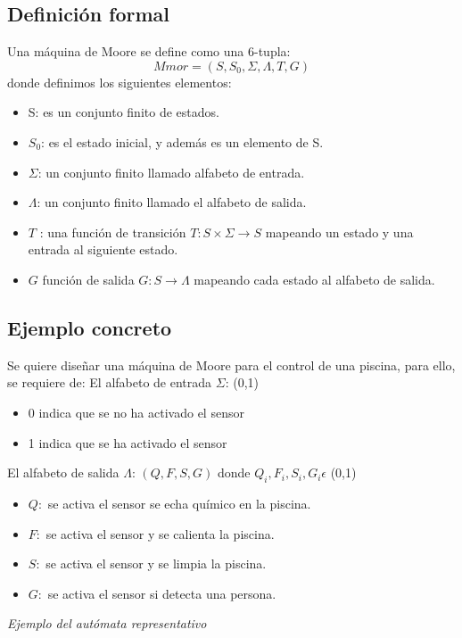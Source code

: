 \documentclass[12pt,a4paper]{article}
\begin{document}
	\subsection{Definición formal}
	Una máquina de Moore se define como una 6-tupla:
	\[ Mmor = (S,S_{0},\Sigma,\Lambda,T,G)  \]
	donde definimos los siguientes elementos:
	\begin{itemize}
		\item S: es un conjunto finito de estados.
		\item $S_{0}$: es el estado inicial, y además es un elemento de S.
		\item $\Sigma$: un conjunto finito llamado alfabeto de entrada.
		\item $\Lambda$: un conjunto finito llamado el alfabeto de salida.
		\item $T$ : una función de transición $T: S \times \Sigma \rightarrow S$ mapeando un estado y una entrada al siguiente estado.
		\item $G$ función de salida $G : S \rightarrow \Lambda $ mapeando cada estado al alfabeto de salida.
	\end{itemize}
	\clearpage
	\subsection{Ejemplo concreto}
	Se quiere diseñar una máquina de Moore para el control de una piscina, para ello, se requiere de:
	\newline
	\newline
	El alfabeto de entrada $\Sigma$: {(0,1)}	
	\begin{itemize}
		\item 0 indica que se no ha activado el sensor
		\item 1 indica que se ha activado el sensor
	\end{itemize}

El alfabeto de salida $\Lambda$: {$(Q,F,S,G)$ donde $Q_{i}, F_{i},S_{i},G_{i}\epsilon$ (0,1) }
	\begin{itemize}
		\item $Q:$ se activa el sensor se echa químico en la piscina.
		\item $F:$ se activa el sensor y se calienta la piscina.
		\item $S:$ se activa el sensor y se limpia la piscina.
		\item $G:$ se activa el sensor si detecta una persona.
	\end{itemize}
	
	
	\begin{center}
			
			\textit{Ejemplo del autómata representativo}
	\end{center}
	
\end{document}
